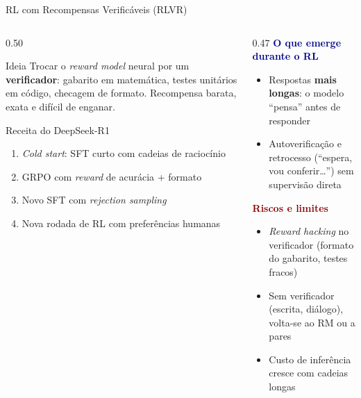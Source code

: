 \documentclass[aspectratio=169, xcolor=dvipsnames]{beamer}
\begin{document}
  \begin{frame}{RL com Recompensas Verificáveis (RLVR) \cite{deepseekr1,lambert2024tulu3}}
    \small
    \begin{columns}[T]
      \begin{column}{0.50\textwidth}
        \begin{block}{Ideia}
          Trocar o \textit{reward model} neural por um \textbf{verificador}: gabarito em matemática, testes unitários em código, checagem de formato. Recompensa barata, exata e difícil de enganar.
        \end{block}
        \begin{block}{Receita do DeepSeek-R1}
          \begin{enumerate}
            \item \textit{Cold start}: SFT curto com cadeias de raciocínio
            \item GRPO com \textit{reward} de acurácia + formato
            \item Novo SFT com \textit{rejection sampling}
            \item Nova rodada de RL com preferências humanas
          \end{enumerate}
        \end{block}
      \end{column}
      \begin{column}{0.47\textwidth}
        \textcolor{DarkBlue}{\textbf{O que emerge durante o RL}}
        \begin{itemize}
          \item Respostas \textbf{mais longas}: o modelo ``pensa'' antes de responder
          \item Autoverificação e retrocesso (``espera, vou conferir\ldots'') sem supervisão direta
        \end{itemize}
        \textcolor{DarkRed}{\textbf{Riscos e limites}}
        \begin{itemize}
          \item \textit{Reward hacking} no verificador (formato do gabarito, testes fracos)
          \item Sem verificador (escrita, diálogo), volta-se ao RM ou a pares
          \item Custo de inferência cresce com cadeias longas
        \end{itemize}
      \end{column}
    \end{columns}
  \note{
}
\end{frame}
\end{document}
